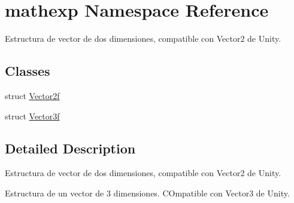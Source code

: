 \hypertarget{namespacemathexp}{}\section{mathexp Namespace Reference}
\label{namespacemathexp}


Estructura de vector de dos dimensiones, compatible con Vector2 de Unity.  


\subsection*{Classes}
\begin{DoxyCompactItemize}
\item 
struct \mbox{\hyperlink{structmathexp_1_1_vector2f}{Vector2f}}
\item 
struct \mbox{\hyperlink{structmathexp_1_1_vector3f}{Vector3f}}
\end{DoxyCompactItemize}


\subsection{Detailed Description}
Estructura de vector de dos dimensiones, compatible con Vector2 de Unity. 

Estructura de un vector de 3 dimensiones. C\+Ompatible con Vector3 de Unity.
